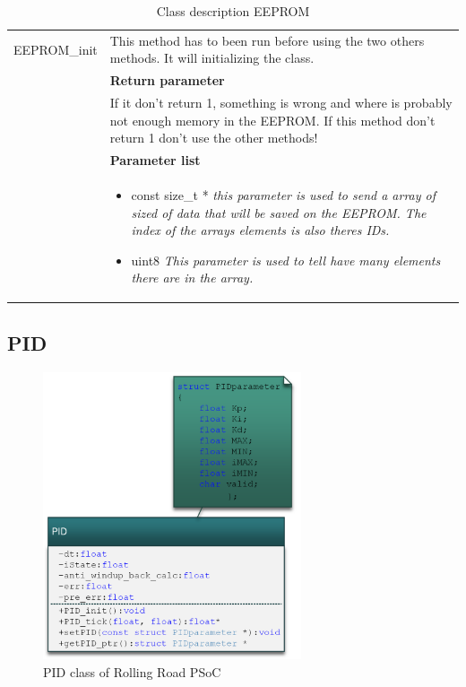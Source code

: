 \begin{table}[H]
\begin{tabular}{|p{5 cm}|p{10 cm}|}
		EEPROM\_init
		& This method has to been run before using the two others methods. It will initializing the class.
		\\ & \textbf{Return parameter}
		\\ & If it don't return 1, something is wrong and where is probably not enough memory in the EEPROM. If this method don't return 1 don't use the other methods!   
		\\ & \textbf{Parameter list}
		\\ & \begin{itemize}
			\item {\large const size\_t *}
			\subitem \textit{this parameter is used to send a array of sized of data that will be saved on the EEPROM. The index of the arrays elements is also theres IDs.}
			\item {\large uint8}
			\subitem \textit{This parameter is used to tell have many elements there are in the array.}
		\end{itemize}
		\\ \hline

	\end{tabular}
	\caption{Class description EEPROM}
	\label{table:Class_description_EEPROM_RR_PSoC}
\end{table}

\subsection{PID}

\begin{figure}[H]
	\centering
	\includegraphics [width=3in]{Software/Pictures/klassediagram_PID.png}
	\caption{PID class of Rolling Road PSoC}
	\label{fig:Class_diagram_PID_RR_PSoC}
\end{figure}



